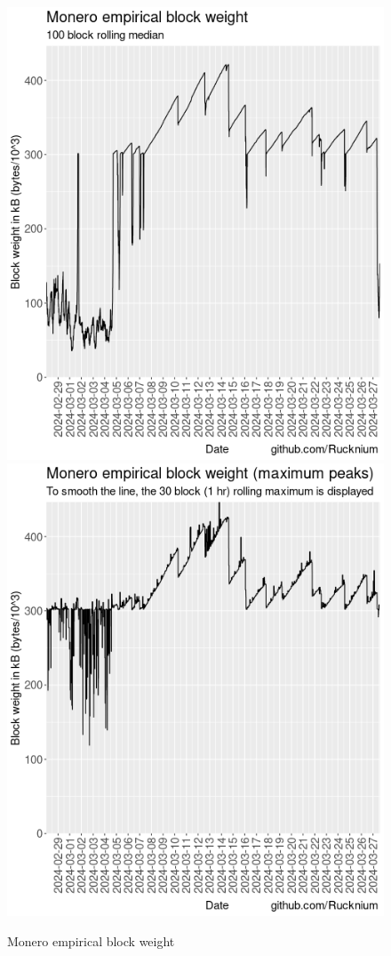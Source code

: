 \documentclass[usletter,11pt,english,openany]{article}
\begin{document}
\begin{figure}[H]
\caption{Monero empirical block weight}
\label{fig-empirical-block-weight}
\centering{}\includegraphics[scale=0.5]{images/rolling-median-block-weight}\includegraphics[scale=0.5]{images/rolling-max-block-weight}
\end{figure}
\end{document}
